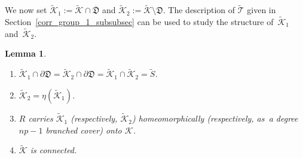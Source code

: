 \documentclass[JEP,XML,SOM,Unicode,NoFloatCountersInSection,published]{cedram}
\newtheorem{lemma}{Lemma}[section]
\theoremstyle{definition}
\theoremstyle{remark}
\newcommand{\cK}{\mathcal{K}}
\begin{document}
We now set $\widetilde{\mathcal{K}}_1:=\widetilde{\mathcal{K}}\cap\overline{\mathfrak{D}}$ and $\widetilde{\mathcal{K}}_2:=\widetilde{\mathcal{K}}\setminus\mathfrak{D}$. The description of $\widetilde{\mathcal{T}}$ given in Section~\ref{corr_group_1_subsubsec} can be used to study the structure of~$\widetilde{\cK}_1$ and~$\widetilde{\cK}_2$.

\skpt
\begin{lemma}\label{lifted_ne_top_lem}
\begin{enumerate}
\item $\widetilde{\cK}_1\cap\partial\mathfrak{D}=\widetilde{\cK}_2\cap\partial\mathfrak{D}=\widetilde{\mathcal{K}}_1\cap\widetilde{\mathcal{K}}_2=\widetilde{S}$.

\item $\widetilde{\mathcal{K}}_2=\eta(\widetilde{\mathcal{K}}_1)$.

\item $R$ carries $\widetilde{\mathcal{K}}_1$ (respectively, $\widetilde{\mathcal{K}}_2$) homeomorphically (respectively, as~a degree $np-1$ branched cover) onto $\mathcal{K}$.

\item $\widetilde{\cK}$ is connected.
\end{enumerate}
\end{lemma}
\end{document}
